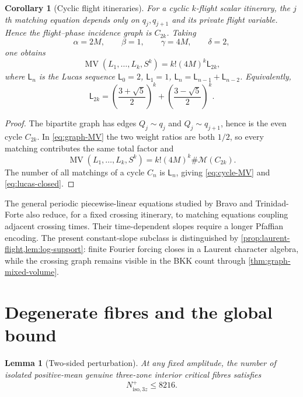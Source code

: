 \documentclass[11pt]{article}
\newtheorem{lemma}[theorem]{Lemma}
\newtheorem{corollary}[theorem]{Corollary}
\newcommand{\MV}{\operatorname{MV}}
\begin{document}
\begin{corollary}[Cyclic flight itineraries]\label{cor:cycle-MV}
For a cyclic $k$-flight scalar itinerary, the $j$th matching equation depends only on $q_j,q_{j+1}$ and its private flight variable.  Hence the flight--phase incidence graph is $C_{2k}$.  Taking
\[
 \alpha=2M,\qquad \beta=1,\qquad
 \gamma=4M,\qquad \delta=2,
\]
one obtains
\begin{equation}\label{eq:cycle-MV}
 \MV(L_1,\ldots,L_k,S^k)
 =k!(4M)^k\mathsf L_{2k},
\end{equation}
where $\mathsf L_n$ is the Lucas sequence $\mathsf L_0=2$, $\mathsf L_1=1$, $\mathsf L_n=\mathsf L_{n-1}+\mathsf L_{n-2}$.  Equivalently,
\begin{equation}\label{eq:lucas-closed}
 \mathsf L_{2k}=
 \left(\frac{3+\sqrt5}{2}\right)^k+
 \left(\frac{3-\sqrt5}{2}\right)^k.
\end{equation}
\end{corollary}

\begin{proof}
The bipartite graph has edges $Q_j\sim q_j$ and $Q_j\sim q_{j+1}$, hence is the even cycle $C_{2k}$.  In \eqref{eq:graph-MV} the two weight ratios are both $1/2$, so every matching contributes the same total factor and
\[
 \MV(L_1,\ldots,L_k,S^k)
 =k!(4M)^k\#\mathcal M(C_{2k}).
\]
The number of all matchings of a cycle $C_n$ is $\mathsf L_n$, giving \eqref{eq:cycle-MV} and \eqref{eq:lucas-closed}.
\end{proof}

The general periodic piecewise-linear equations studied by Bravo and Trinidad-Forte \cite{BravoTrinidadForte2026} also reduce, for a fixed crossing itinerary, to matching equations coupling adjacent crossing times.  Their time-dependent slopes require a longer Pfaffian encoding.  The present constant-slope subclass is distinguished by \cref{prop:laurent-flight,lem:log-support}: finite Fourier forcing closes in a Laurent character algebra, while the crossing graph remains visible in the BKK count through \cref{thm:graph-mixed-volume}.




\section{Degenerate fibres and the global bound}\label{sec:global}

\begin{lemma}[Two-sided perturbation]\label{lem:perturbation}
At any fixed amplitude, the number of isolated positive-mean genuine three-zone interior critical fibres satisfies
\begin{equation}\label{eq:isolated-bound}
 N_{\mathrm{iso},3z}^{+}\le8216.
\end{equation}
\end{lemma}
\end{document}
